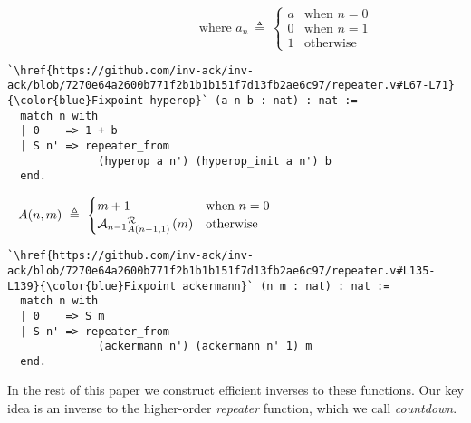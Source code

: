 \begin{equation*}
\hspace{8em}\text{where  } a_n ~ \triangleq ~ \begin{cases}
a & \text{when } n = 0 \\
0 & \text{when } n = 1 \\
1 & \text{otherwise}
\end{cases}
\end{equation*}
\begin{lstlisting} 
`\href{https://github.com/inv-ack/inv-ack/blob/7270e64a2600b771f2b1b1b151f7d13fb2ae6c97/repeater.v#L67-L71}{\color{blue}Fixpoint hyperop}` (a n b : nat) : nat :=
  match n with
  | 0    => 1 + b
  | S n' => repeater_from
              (hyperop a n') (hyperop_init a n') b
  end.
\end{lstlisting}

\pagebreak
\begin{equation*}
A(n,m) ~ \triangleq ~ \begin{cases}
m + 1 & \text{when } n = 0 \\
\rf{\mathcal{A}_{n-1}}{A(n-1,1)\ }(m) & \text{otherwise}
\end{cases} \qquad \qquad \qquad \qquad \qquad \qquad \qquad ~ 
\end{equation*}
\begin{lstlisting}
`\href{https://github.com/inv-ack/inv-ack/blob/7270e64a2600b771f2b1b1b151f7d13fb2ae6c97/repeater.v#L135-L139}{\color{blue}Fixpoint ackermann}` (n m : nat) : nat :=
  match n with
  | 0    => S m
  | S n' => repeater_from
              (ackermann n') (ackermann n' 1) m
  end.
\end{lstlisting}
In the rest of this paper we construct efficient inverses to these
functions.  Our key idea is an inverse to the higher-order \emph{repeater} function, which we call \emph{countdown}.

